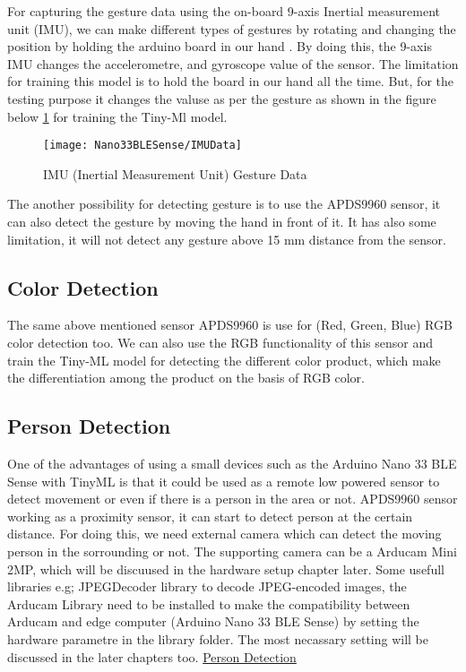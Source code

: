 For capturing the gesture data using the on-board 9-axis Inertial measurement unit (IMU), we can make different types of gestures by rotating and changing the position by holding the arduino board in our hand . By doing this, the 9-axis IMU changes the accelerometre, and gyroscope value of the sensor. The limitation for training this model is to hold the board in our hand all the time. But, for the testing purpose it changes the valuse as per the gesture as shown in the figure below \ref{IMU Sensor Capture Data} for training the Tiny-Ml model.\cite{Arduino:2021}

\begin{figure}[ht]
    \centering
    \texttt{[image: Nano33BLESense/IMUData]}
    \caption{IMU (Inertial Measurement Unit) Gesture Data} 
    \label{IMU Sensor Capture Data}
\end{figure}

The another possibility for detecting gesture is to use the APDS9960 sensor, it can also detect the gesture by moving the hand in front of it. It has also some limitation, it will not detect any gesture above 15 mm distance from the sensor.

\subsection{Color Detection}

The same above mentioned sensor APDS9960 is use for (Red, Green, Blue) RGB color detection too. We can also use the RGB functionality of this sensor and train the Tiny-ML model for detecting the different color product, which make the differentiation among the product on the basis of RGB color.

\subsection{Person Detection} 

One of the advantages of using a small devices such as the Arduino Nano 33 BLE Sense with TinyML is that it could be used as a remote low powered sensor to detect movement or even if there is a person in the area or not. APDS9960 sensor working as a proximity sensor, it can start to detect person at the certain distance. For doing this, we need external camera which can detect the moving person in the sorrounding or not. The supporting camera can be a Arducam Mini 2MP, which will be discuused in the hardware setup chapter later. Some usefull libraries e.g; JPEGDecoder library to decode JPEG-encoded images, the Arducam Library  need to be installed to make the compatibility between Arducam and edge computer (Arduino Nano 33 BLE Sense) by setting the hardware parametre in the library folder. The most necassary setting will be discussed in the later chapters too. \href{https://www.element14.com/community/community/project14/nano-rama/blog/2020/04/29/tinyml-on-arduino-nano-33-ble-sense-person-detection-with-ble}{Person Detection}

